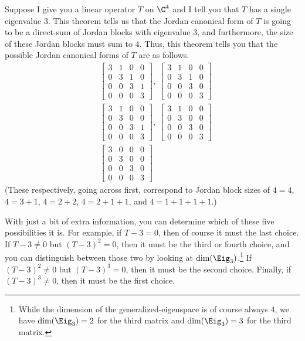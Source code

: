 \begin{exm}{}{}
	Suppose I give you a linear operator $T$ on $\C ^4$ and I tell you that $T$ has a single eigenvalue $3$.  This theorem tells us that the Jordan canonical form of $T$ is going to be a direct-sum of Jordan blocks with eigenvalue $3$, and furthermore, the size of these Jordan blocks must sum to $4$.  Thus, this theorem tells you that the possible Jordan canonical forms of $T$ are as follows.
	\begin{equation}
	\begin{split}
		& \begin{bmatrix}3 & 1 & 0 & 0 \\ 0 & 3 & 1 & 0 \\ 0 & 0 & 3 & 1 \\ 0 & 0 & 0 & 3\end{bmatrix},\ \begin{bmatrix}3 & 1 & 0 & 0 \\ 0 & 3 & 1 & 0 \\ 0 & 0 & 3 & 0 \\ 0 & 0 & 0 & 3\end{bmatrix} \\ & \begin{bmatrix}3 & 1 & 0 & 0 \\ 0 & 3 & 0 & 0 \\ 0 & 0 & 3 & 1 \\ 0 & 0 & 0 & 3\end{bmatrix},\ \begin{bmatrix}3 & 1 & 0 & 0 \\ 0 & 3 & 0 & 0 \\ 0 & 0 & 3 & 0 \\ 0 & 0 & 0 & 3\end{bmatrix} \\ & \begin{bmatrix}3 & 0 & 0 & 0 \\ 0 & 3 & 0 & 0 \\ 0 & 0 & 3 & 0 \\ 0 & 0 & 0 & 3\end{bmatrix}
	\end{split}
	\end{equation}
	(These respectively, going across first, correspond to Jordan block sizes of $4=4$, $4=3+1$, $4=2+2$, $4=2+1+1$, and $4=1+1+1+1$.)
	
	With just a bit of extra information, you can determine which of these five possibilities it is.  For example, if $T-3=0$, then of course it must the last choice.  If $T-3\neq 0$ but $(T-3)^2=0$, then it must be the third or fourth choice, and you can distinguish between those two by looking at $\dim (\Eig _3)$.\footnote{While the dimension of the generalized-eigenspace is of course always $4$, we have $\dim (\Eig _3)=2$ for the third matrix and $\dim (\Eig _3)=3$ for the third matrix.}  If $(T-3)^2\neq 0$ but $(T-3)^3=0$, then it must be the second choice.  Finally, if $(T-3)^3\neq 0$, then it must be the first choice.
\end{exm}

